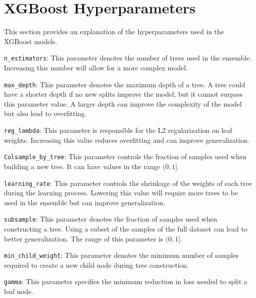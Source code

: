 \section{XGBoost Hyperparameters}

This section provides an explanation of the hyperparameters used in the XGBoost models.

\texttt{n\_estimators}: This parameter denotes the number of trees used in the ensemble.
Increasing this number will allow for a more complex model.

\texttt{max\_depth}: This parameter denotes the maximum depth of a tree.
A tree could have a shorter depth if no new splits improve the model, but it cannot surpass this parameter value.
A larger depth can improve the complexity of the model but also lead to overfitting.

\texttt{reg\_lambda}: This parameter is responsible for the L2 regularization on leaf weights.
Increasing this value reduces overfitting and can improve generalization.

\texttt{Colsample\_by\_tree}: This parameter controls the fraction of samples used when building a new tree.
It can have values in the range $(0,1]$.

\texttt{learning\_rate}: This parameter controls the shrinkage of the weights of each tree during the learning process.
Lowering this value will require more trees to be used in the ensemble but can improve generalization.

\texttt{subsample}: This parameter denotes the fraction of samples used when constructing a tree.
Using a subset of the samples of the full dataset can lead to better generalization.
The range of this parameter is $(0,1]$.

\texttt{min\_child\_weight}: This parameter denotes the minimum number of samples required to create a new child node during tree construction.

\texttt{gamma}: This parameter specifies the minimum reduction in loss needed to split a leaf node.